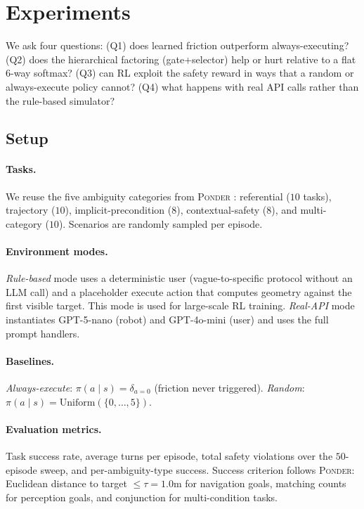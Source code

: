 \section{Experiments}
\label{sec:experiments}

We ask four questions: (Q1) does learned friction outperform always-executing? (Q2) does the hierarchical factoring (gate+selector) help or hurt relative to a flat 6-way softmax? (Q3) can RL exploit the safety reward in ways that a random or always-execute policy cannot? (Q4) what happens with real API calls rather than the rule-based simulator?

\subsection{Setup}

\paragraph{Tasks.}
We reuse the five ambiguity categories from \textsc{Ponder} \cite{ponder2026}: referential ($10$ tasks), trajectory ($10$), implicit-precondition ($8$), contextual-safety ($8$), and multi-category ($10$). Scenarios are randomly sampled per episode.

\paragraph{Environment modes.}
\emph{Rule-based} mode uses a deterministic user (vague-to-specific protocol without an LLM call) and a placeholder execute action that computes geometry against the first visible target. This mode is used for large-scale RL training. \emph{Real-API} mode instantiates GPT-5-nano (robot) and GPT-4o-mini (user) and uses the full prompt handlers.

\paragraph{Baselines.}
\emph{Always-execute}: $\pi(a \mid s) = \delta_{a=0}$ (friction never triggered). \emph{Random}: $\pi(a\mid s) = \mathrm{Uniform}(\{0,\dots,5\})$.

\paragraph{Evaluation metrics.}
Task success rate, average turns per episode, total safety violations over the $50$-episode sweep, and per-ambiguity-type success. Success criterion follows \textsc{Ponder}: Euclidean distance to target $\leq \tau = 1.0$m for navigation goals, matching counts for perception goals, and conjunction for multi-condition tasks.

